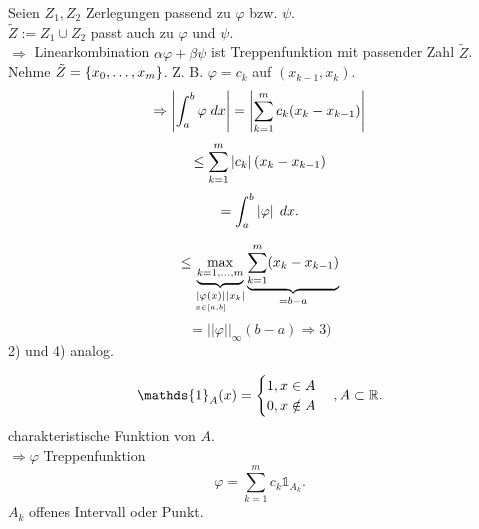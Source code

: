 \documentclass[../ana2.tex]{subfiles}
\begin{document}
\begin{bew}
    Seien \( Z_1, Z_2 \) Zerlegungen passend zu \( \varphi \) bzw. 
    \( \psi \).\\
    \( \tilde{Z} := Z_1 \cup Z_2 \) passt auch zu \( \varphi \) und 
    \( \psi \).\\
    \( \Rightarrow \) Linearkombination \( \alpha \varphi + \beta \psi \) 
    ist Treppenfunktion mit passender Zahl \( \tilde{Z} \).\\
    Nehme \( \tilde{Z} = \{x_0,\ldots, x_m\} \).
    Z. B. \( \varphi = c_k \) auf \( (x_{k-1}, x_k) \).
    \[ \Rightarrow \left| \int_{a}^{b} \varphi \;dx \right| 
    = \left|\sum_{k=1}^m c_k (x_k - x_{k-1}) \right| \]
    \[ \leq \sum_{k=1}^m \left|c_k\right| (x_k - x_{k-1}) \]
    \[ = \int_{a}^{b} \left|\varphi\right| \;dx. \]

    \[ \leq \underbrace{\underset{k=1,\dots,m}{\max}}
    _{\underset{x \in [a,b]}{\left|\varphi(x)\right|} \left|x_k\right|}
    \underbrace{\sum_{k=1}^m (x_k-x_{k-1})}_{=b-a} \]
    \[ = ||\varphi||_\infty (b-a) \Rightarrow \text{3)} \]
    2) und 4) analog.
\end{bew}
\begin{bem}
    \[ \mathds{1}_A (x) = \begin{cases}
        1, x \in A \\
        0, x \notin A
    \end{cases}, A\subset \R. \]
    charakteristische Funktion von \(A\).\\
    \( \Rightarrow \varphi \) Treppenfunktion
    \[ \varphi = \sum_{k=1}^m c_k \mathds{1}_{A_k}. \]
    \( A_k \) offenes Intervall oder Punkt.
\end{bem}
\end{document}
